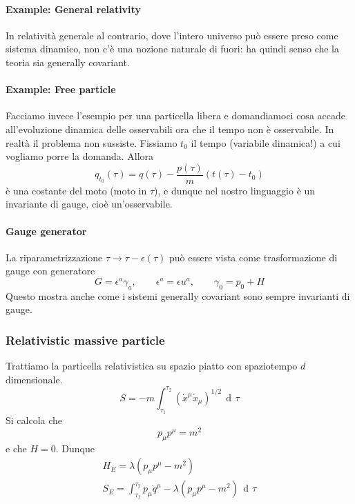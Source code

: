 \documentclass[a4paper, 11pt]{article}
\newcommand{\dd}{\mathop{\mathrm{d}\!}{}}
\begin{document}
	\paragraph{Example: General relativity}
	In relatività generale al contrario, dove l'intero universo può essere preso come sistema dinamico, non c'è una nozione naturale di fuori: ha quindi senso che la teoria sia generally covariant.
	
	\paragraph{Example: Free particle}
	Facciamo invece l'esempio per una particella libera e domandiamoci cosa accade all'evoluzione dinamica delle osservabili ora che il tempo non è osservabile. In realtà il problema non sussiste. Fissiamo $t_0$ il tempo (variabile dinamica!) a cui vogliamo porre la domanda. Allora
	\begin{equation*}
	q_{t_0} (\tau) = q(\tau) - \dfrac{p(\tau)}{m} (t(\tau)-t_0)
	\end{equation*}
	è una costante del moto (moto in $\tau$), e dunque nel nostro linguaggio è un invariante di gauge, cioè un'osservabile.
	
	\paragraph{Gauge generator}
	La riparametrizzazione $\tau \rightarrow \tau - \epsilon(\tau)$  può essere vista come trasformazione di gauge con generatore
	\begin{equation*}
	G = \epsilon^a \gamma_a,\qquad \epsilon^a = \epsilon u^a,\qquad \gamma_0 = p_0 + H
	\end{equation*}
	Questo mostra anche come i sistemi generally covariant sono sempre invarianti di gauge.
	
	\subsubsection{Relativistic massive particle}
	Trattiamo la particella relativistica su spazio piatto con spaziotempo $d$ dimensionale.
	\begin{equation*}
	S = -m \int_{\tau_1}^{\tau_2} (\dot{x}^\mu \dot{x}_\mu)^{1/2}\,\dd\tau
	\end{equation*}
	Si calcola che
	\begin{equation*}
	p_\mu p^\mu = m^2
	\end{equation*}
	e che $H=0$. Dunque
	\begin{eqnarray}
	H_E = \lambda(p_\mu p^\mu -m^2) \\
	S_E = \int_{\tau_1}^{\tau_2} p_\mu \dot{q}^\mu - \lambda(p_\mu p^\mu - m^2)\, \dd \tau
	\end{eqnarray}
	
\end{document}
